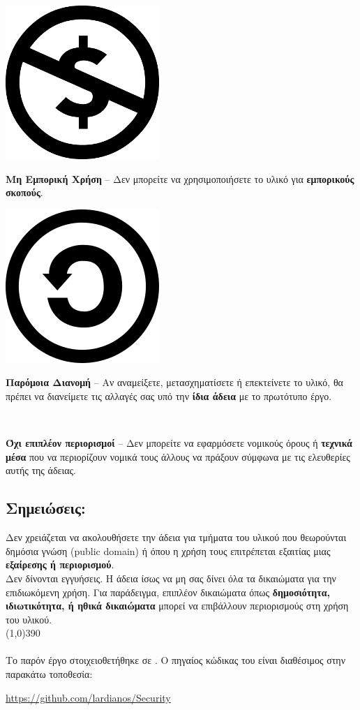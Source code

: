 \vspace{1em}
\noindent
\parbox{1.5cm}{\includegraphics[scale=0.15]{license/images/cc_nc_30}}
\parbox{10.5cm}{\textbf{Μη Εμπορική Χρήση} --  Δεν μπορείτε να χρησιμοποιήσετε το υλικό για \textbf{εμπορικούς σκοπούς}.}

\vspace{1em}
\noindent
\parbox{1.5cm}{\includegraphics[scale=0.15]{license/images/cc_sa_30}}
\parbox{10.5cm}{\textbf{Παρόμοια Διανομή}  -- Αν αναμείξετε, μετασχηματίσετε ή επεκτείνετε το υλικό, θα πρέπει να διανείμετε τις αλλαγές σας υπό την \textbf{ίδια άδεια} με το πρωτότυπο έργο.}

\vspace{1em}
\noindent
\parbox{1.5cm}{\ }
\parbox{10.5cm}{\textbf{Όχι επιπλέον περιορισμοί} -- Δεν μπορείτε να εφαρμόσετε νομικούς όρους ή \textbf{τεχνικά μέσα} που να περιορίζουν νομικά τους άλλους να πράξουν σύμφωνα με τις ελευθερίες αυτής της άδειας.}
\subsection*{Σημειώσεις:}
\noindent
Δεν χρειάζεται να ακολουθήσετε την άδεια για τμήματα του υλικού που θεωρούνται δημόσια γνώση (public domain) ή όπου η χρήση τους επιτρέπεται εξαιτίας μιας \textbf{εξαίρεσης ή περιορισμού}.\\

\noindent
Δεν δίνονται εγγυήσεις. Η άδεια ίσως να μη σας δίνει όλα τα δικαιώματα για την επιδιωκόμενη χρήση. Για παράδειγμα, επιπλέον δικαιώματα όπως \textbf{δημοσιότητα, ιδιωτικότητα, ή ηθικά δικαιώματα} μπορεί να επιβάλλουν περιορισμούς στη χρήση του υλικού.\\
\line(1,0){390}\\\\
\noindent
Το παρόν έργο στοιχειοθετήθηκε σε \XeLaTeX. Ο πηγαίος κώδικας του είναι διαθέσιμος στην παρακάτω τοποθεσία:
\begin{center}
\url{https://github.com/lardianos/Security}
\end{center}
\newpage